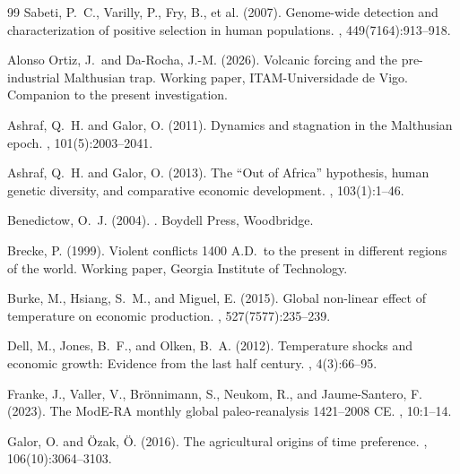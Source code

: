 \documentclass[11pt,letterpaper]{article}
\begin{document}
\begin{thebibliography}{99}
Sabeti, P.~C., Varilly, P., Fry, B., et al. (2007).
\newblock Genome-wide detection and characterization of positive selection in human populations.
, 449(7164):913--918.

Alonso Ortiz, J.\ and Da-Rocha, J.-M. (2026).
\newblock Volcanic forcing and the pre-industrial Malthusian trap.
\newblock Working paper, ITAM-Universidade de Vigo. Companion to the present investigation.

Ashraf, Q.~H. and Galor, O. (2011).
\newblock Dynamics and stagnation in the Malthusian epoch.
, 101(5):2003--2041.

Ashraf, Q.~H. and Galor, O. (2013).
\newblock The ``Out of Africa'' hypothesis, human genetic diversity, and comparative economic development.
, 103(1):1--46.

Benedictow, O.~J. (2004).
.
\newblock Boydell Press, Woodbridge.

Brecke, P. (1999).
\newblock Violent conflicts 1400 A.D.\ to the present in different regions of the world.
\newblock Working paper, Georgia Institute of Technology.

Burke, M., Hsiang, S.~M., and Miguel, E. (2015).
\newblock Global non-linear effect of temperature on economic production.
, 527(7577):235--239.

Dell, M., Jones, B.~F., and Olken, B.~A. (2012).
\newblock Temperature shocks and economic growth: Evidence from the last half century.
, 4(3):66--95.

Franke, J., Valler, V., Br\"onnimann, S., Neukom, R., and Jaume-Santero, F. (2023).
\newblock The {ModE-RA} monthly global paleo-reanalysis 1421--2008 CE.
, 10:1--14.

Galor, O. and \"Ozak, \"O. (2016).
\newblock The agricultural origins of time preference.
, 106(10):3064--3103.


\end{thebibliography}
\end{document}
